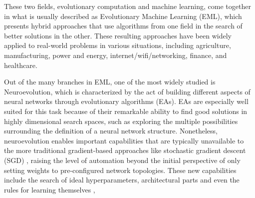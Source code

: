 \documentclass[12pt]{article}
\begin{document}
These two fields, evolutionary computation and machine learning, come together in what is usually described as Evolutionary Machine Learning (EML), which presents hybrid approaches that use algorithms from one field in the search of better solutions in the other. These resulting approaches have been widely applied to real-world problems in various situations, including agriculture, manufacturing, power and energy, internet/wifi/networking, finance, and healthcare. \cite{Al-Sahaf:2019}

Out of the many branches in EML, one of the most widely studied is Neuroevolution, which is characterized by the act of building different aspects of neural networks through evolutionary algorithms (EAs). EAs are especially well suited for this task because of their remarkable ability to find good solutions in highly dimensional search spaces, such as exploring the multiple possibilities surrounding the definition of a neural network structure. Nonetheless, neuroevolution enables important capabilities that are typically unavailable to the more traditional gradient-based approaches like stochastic gradient descent (SGD) \cite{Rumelhart1986}, raising the level of automation beyond the initial perspective of only setting weights to pre-configured network topologies. These new capabilities include the search of ideal hyperparameters, architectural parts and even the rules for learning themselves \cite{Stanley2019}, 


    \begin{comment}
     Out of the many branches in EML, one of the most widely studied is Neuroevolution, which is characterized by techniques that take profit of the remarkable ability of evolutionary algorithms (EAs) to generate good solutions in highly dimensional search spaces to search for possible configurations of neural networks, a type of algorithm known for its great flexibility in hyperparameters and design options. Since NNs are so flexible, there are many opportunities to apply evolution-inspired techniques to explore possible configurations while not becoming too tied to domain knowledge and reducing human benchmarking.
    Neuroevolution also enables important capabilities that are typically unavailable to the more traditional gradient-based approaches like stochastic gradient descent (SGD) \cite{Rumelhart1986}. \hl{cp: Such capabilities for neural networks include learning their building blocks (for example activation functions), hyperparameters (for example learning rates), architectures (for example the number of neurons per layer, how many layers there are, and which layers connect to which) and even the rules for learning themselves } \cite{Stanley2019}.
    \end{comment}
\end{document}
